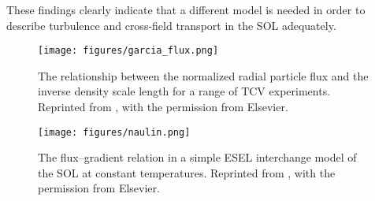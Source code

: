 These findings clearly indicate that a different model is needed in order to describe turbulence and cross-field transport in the SOL adequately. 
\begin{figure}
	\centering
	\begin{minipage}{.48\linewidth}
			\texttt{[image: figures/garcia\_flux.png]}
	\caption{The relationship between the normalized radial particle flux and the inverse density scale length for a range of TCV experiments. Reprinted from \cite{garcia2007turbulent}, with the permission from Elsevier.}
		\label{Fig:garcia_flux}
	\end{minipage}
	\hfill
	\begin{minipage}{.48\linewidth}
		\texttt{[image: figures/naulin.png]}
	\caption{The ﬂux–gradient relation in a simple ESEL interchange model of the SOL at constant temperatures. Reprinted from \cite{naulin2007turbulent}, with the permission from Elsevier.}
		\label{Fig:naulin}
	\end{minipage}
\end{figure}


